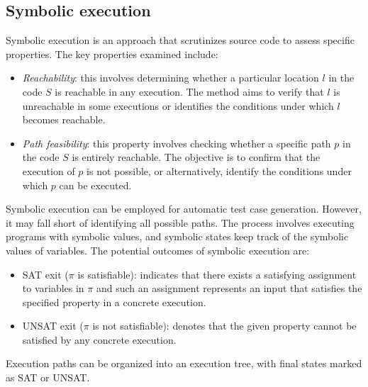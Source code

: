 \subsection{Symbolic execution}
Symbolic execution is an approach that scrutinizes source code to assess specific properties. 
The key properties examined include:
\begin{itemize}
    \item \textit{Reachability}: this involves determining whether a particular location $l$ in the code $S$ is reachable in any execution. 
        The method aims to verify that $l$ is unreachable in some executions or identifies the conditions under which $l$ becomes reachable.
    \item \textit{Path feasibility}: this property involves checking whether a specific path $p$ in the code $S$ is entirely reachable. 
        The objective is to confirm that the execution of $p$ is not possible, or alternatively, identify the conditions under which $p$ can be executed.
\end{itemize} 
Symbolic execution can be employed for automatic test case generation. 
However, it may fall short of identifying all possible paths.
The process involves executing programs with symbolic values, and symbolic states keep track of the symbolic values of variables.
The potential outcomes of symbolic execution are:
\begin{itemize}
    \item SAT exit ($\pi$ is satisfiable): indicates that there exists a satisfying assignment to variables in $\pi$ and such an assignment represents an input that satisfies the specified property in a concrete execution.
    \item UNSAT exit ($\pi$ is not satisfiable): denotes that the given property cannot be satisfied by any concrete execution.
\end{itemize}
Execution paths can be organized into an execution tree, with final states marked as SAT or UNSAT.
